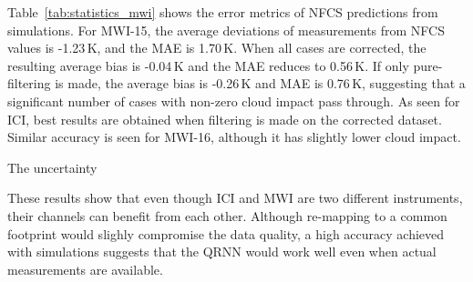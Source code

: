 \documentclass[amt, manuscript]{copernicus}
\begin{document}
Table~\ref{tab:statistics_mwi} shows the error metrics of NFCS predictions from simulations. For MWI-15, the average deviations of measurements from NFCS values is -1.23\,K, and the MAE is 1.70\,K. When all cases are corrected, the resulting average bias is -0.04\,K and the MAE reduces to 0.56\,K. If only pure-filtering is made, the average bias is -0.26\,K and MAE is 0.76\,K, suggesting that a significant number of cases with non-zero cloud impact pass through. As seen for ICI, best results are obtained  when filtering is made on the corrected dataset. Similar accuracy is seen for MWI-16, although it has slightly lower cloud impact. 

The uncertainty 

These results show that even though ICI and MWI are two different instruments, their channels can benefit from each other. Although re-mapping to a common footprint would slighly compromise the data quality, a high accuracy achieved with simulations suggests that the QRNN would work well even when actual measurements are available.
\end{document}
